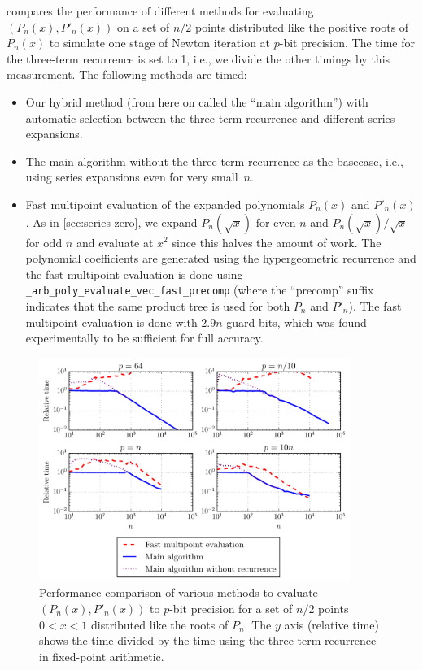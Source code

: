 \documentclass[nohypdvips,review]{siamart0216}
\begin{document}
\label{sec:bench-variants}

 compares the performance of different methods
for evaluating $(P_n(x), P'_n(x))$ on a set of $n/2$ points
distributed like the positive roots of $P_n(x)$
to simulate one stage of Newton iteration at $p$-bit precision.
The time for the three-term recurrence is set to 1, i.e., we divide
the other timings by this measurement.
The following methods are timed:

\begin{itemize}
\item Our hybrid method (from here on called the ``main algorithm'')
with automatic selection between the three-term
recurrence and different
series expansions.
\item The main algorithm without
the three-term recurrence as the basecase, i.e., using series expansions
even for very small~$n$.
\item Fast multipoint
evaluation of the expanded polynomials $P_n(x)$ and $P'_n(x)$.
As in \cref{sec:series-zero}, we expand
$P_{n}(\sqrt{x})$ for even $n$ and $P_{n}(\sqrt{x})/\sqrt{x}$ for odd $n$
and evaluate at $x^2$ since this halves the amount of work.
The polynomial coefficients are generated using
the hypergeometric recurrence and
the fast multipoint evaluation is done using
\texttt{\_arb\_poly\_evaluate\_vec\_fast\_precomp}
(where the ``precomp'' suffix indicates that
the same product tree is used for both $P_n$ and $P'_n$).
The fast multipoint evaluation is done with $2.9n$ guard bits,
which was found experimentally to be sufficient for full accuracy.
\end{itemize}

\begin{figure}
\begin{centering}
\includegraphics[width=0.9\textwidth]{benchplot}
\caption{Performance comparison of various methods to evaluate $(P_n(x), P'_n(x))$ to $p$-bit precision for a
set of $n / 2$ points $0 < x < 1$ distributed like the roots of $P_n$.
The $y$ axis (relative time) shows the time divided by the time
using the three-term recurrence in fixed-point arithmetic.}
\label{fig:benchplot}
\end{centering}
\end{figure}
\end{document}
